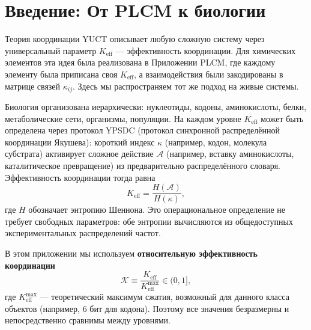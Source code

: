 \documentclass[12pt,a4paper]{article}
\newcommand{\REL}{\mathcal{K}}          %
\begin{document}
	\section{Введение: От PLCM к биологии}
	Теория координации YUCT описывает любую сложную систему через универсальный параметр \(K_{\mathrm{eff}}\) — эффективность координации. Для химических элементов эта идея была реализована в Приложении PLCM, где каждому элементу была приписана своя \(K_{\mathrm{eff}}\), а взаимодействия были закодированы в матрице связей \(\kappa_{ij}\). Здесь мы распространяем тот же подход на живые системы.
	
	Биология организована иерархически: нуклеотиды, кодоны, аминокислоты, белки, метаболические сети, организмы, популяции. На каждом уровне \(K_{\mathrm{eff}}\) может быть определена через протокол YPSDC (протокол синхронной распределённой координации Якушева): короткий индекс \(\kappa\) (например, кодон, молекула субстрата) активирует сложное действие \(\mathcal{A}\) (например, вставку аминокислоты, каталитическое превращение) из предварительно распределённого словаря. Эффективность координации тогда равна
	\[
	K_{\mathrm{eff}} = \frac{H(\mathcal{A})}{H(\kappa)},
	\]
	где \(H\) обозначает энтропию Шеннона. Это операциональное определение не требует свободных параметров: обе энтропии вычисляются из общедоступных экспериментальных распределений частот.
	
	В этом приложении мы используем \textbf{относительную эффективность координации}
	\[
	\REL \equiv \frac{K_{\mathrm{eff}}}{K_{\mathrm{eff}}^{\max}} \in (0,1],
	\]
	где \(K_{\mathrm{eff}}^{\max}\) — теоретический максимум сжатия, возможный для данного класса объектов (например, 6 бит для кодона). Поэтому все значения безразмерны и непосредственно сравнимы между уровнями.
	
\end{document}
